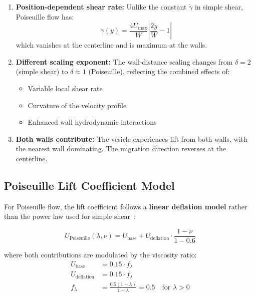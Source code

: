 \documentclass{article}
\begin{document}
\begin{enumerate}
    \item \textbf{Position-dependent shear rate:} Unlike the constant $\dot{\gamma}$ in simple shear, Poiseuille flow has:
    \begin{equation}
        \dot{\gamma}(y) = \frac{4 U_{\max}}{W} \left| \frac{2y}{W} - 1 \right|
    \end{equation}
    which vanishes at the centerline and is maximum at the walls.
    
    \item \textbf{Different scaling exponent:} The wall-distance scaling changes from $\delta = 2$ (simple shear) to $\delta \approx 1$ (Poiseuille), reflecting the combined effects of:
    \begin{itemize}
        \item Variable local shear rate
        \item Curvature of the velocity profile
        \item Enhanced wall hydrodynamic interactions
    \end{itemize}
    
    \item \textbf{Both walls contribute:} The vesicle experiences lift from both walls, with the nearest wall dominating. The migration direction reverses at the centerline.
\end{enumerate}

\subsection{Poiseuille Lift Coefficient Model}

For Poiseuille flow, the lift coefficient follows a \textbf{linear deflation model} rather than the power law used for simple shear~\cite{coupier2009}:

\begin{equation}
    U_{\text{Poiseuille}}(\lambda, \nu) = U_{\text{base}} + U_{\text{deflation}} \cdot \frac{1 - \nu}{1 - 0.6}
    \label{eq:lift_poiseuille}
\end{equation}

where both contributions are modulated by the viscosity ratio:
\begin{align}
    U_{\text{base}} &= 0.15 \cdot f_\lambda \\
    U_{\text{deflation}} &= 0.15 \cdot f_\lambda \\
    f_\lambda &= \frac{0.5(1 + \lambda)}{1 + \lambda} = 0.5 \quad \text{for } \lambda > 0
\end{align}
\end{document}
